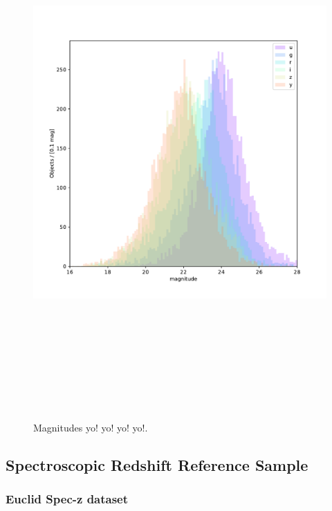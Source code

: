 \begin{figure}
    \centering
    \includegraphics[height=8in]{figures/mags.pdf}
    \caption{Magnitudes yo! yo! yo! yo!.}
    \label{fig:dp_mags}
\end{figure}



\subsection{Spectroscopic Redshift Reference Sample}
\label{sec:data:reference}


\subsubsection{Euclid Spec-z dataset}
\label{sec:data:euclid}

